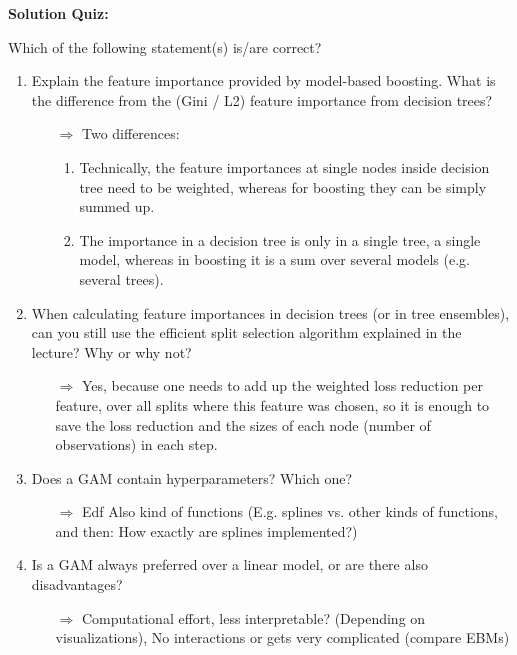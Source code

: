 \textbf{Solution Quiz:}\\\noindent
\medskip

Which of the following statement(s) is/are correct?  
	\begin{enumerate}
        \item Explain the feature importance provided by model-based boosting. What is the difference from the (Gini / L2) feature importance from decision trees?
        \begin{itemize}
            \item[$\Rightarrow$] Two differences:
            \begin{enumerate}
                \item Technically, the feature importances at single nodes inside decision tree need to be weighted, whereas for boosting they can be simply summed up.
                \item The importance in a decision tree is only in a single tree, a single model, whereas in boosting it is a sum over several models (e.g. several trees).
            \end{enumerate}
        \end{itemize}

        \item When calculating feature importances in decision trees (or in tree ensembles), can you still use the efficient split selection algorithm explained in the lecture? Why or why not?
        \begin{itemize}
            \item[$\Rightarrow$] Yes, because one needs to add up the weighted loss reduction per feature, over all splits where this feature was chosen, so it is enough to save the loss reduction and the sizes of each node (number of observations) in each step.
        \end{itemize}

        \item Does a GAM contain hyperparameters? Which one?
        \begin{itemize}
            \item[$\Rightarrow$] Edf
            Also kind of functions (E.g. splines vs. other kinds of functions, and then: How exactly are splines implemented?)
        \end{itemize}
    
        \item Is a GAM always preferred over a linear model, or are there also disadvantages?
        \begin{itemize}
            \item[$\Rightarrow$] Computational effort, less interpretable? (Depending on visualizations), No interactions or gets very complicated (compare EBMs)
        \end{itemize}


\end{enumerate}
